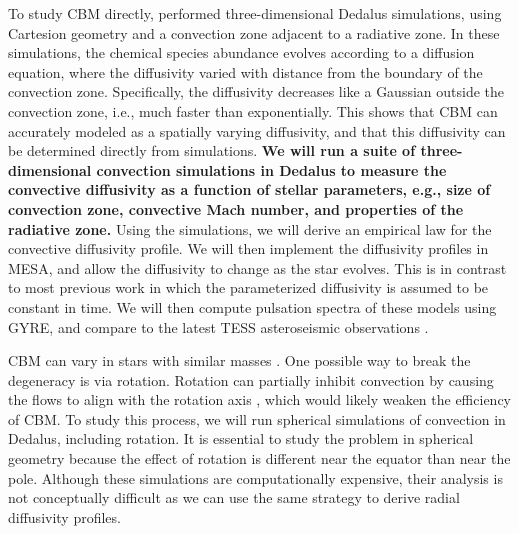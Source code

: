 To study CBM directly, \citet{Lecoanet_2016a} performed three-dimensional Dedalus simulations, using Cartesion geometry and a convection zone adjacent to a radiative zone. In these simulations, the chemical species abundance evolves according to a diffusion equation, where the diffusivity varied with distance from the boundary of the convection zone. Specifically, the diffusivity decreases like a Gaussian outside the convection zone, i.e., much faster than exponentially. This shows that CBM can accurately modeled as a spatially varying diffusivity, and that this diffusivity can be determined directly from simulations. \textbf{We will run a suite of three-dimensional convection simulations in Dedalus to measure the convective diffusivity as a function of stellar parameters, e.g., size of convection zone, convective Mach number, and properties of the radiative zone.} Using the simulations, we will derive an empirical law for the convective diffusivity profile. We will then implement the diffusivity profiles in MESA, and allow the diffusivity to change as the star evolves. {\color{green} This is in contrast to most previous work in which the parameterized diffusivity is assumed to be constant in time.} We will then compute pulsation spectra of these models using GYRE, and compare to the latest TESS asteroseismic observations \citep[similar to][]{moravveji:15,Ghasemi_2016}.

CBM can vary in stars with similar masses \citep{Stancliffe_2015}. One possible way to break the degeneracy is via rotation. Rotation can partially inhibit convection by causing the flows to align with the rotation axis \cite[e.g.,][]{Featherstone_2016}, which would likely weaken the efficiency of CBM. To study this process, we will run spherical simulations of convection in Dedalus, including rotation. It is essential to study the problem in spherical geometry because the effect of rotation is different near the equator than near the pole. Although these simulations are computationally expensive, their analysis is not conceptually difficult as we can use the same strategy to derive radial diffusivity profiles.
